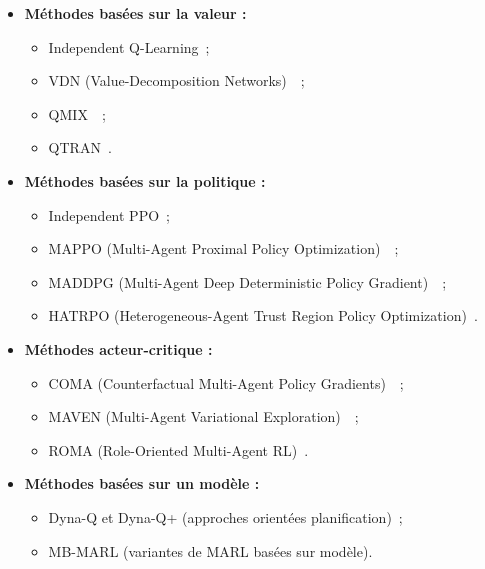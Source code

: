 \begin{itemize}
    \item \textbf{Méthodes basées sur la valeur :}
          \begin{itemize}
              \item Independent Q-Learning~;
              \item VDN (Value-Decomposition Networks)~\cite{sunehag2018vdn}~;
              \item QMIX~\cite{rashid2018qmix}~;
              \item QTRAN~\cite{son2019qtran}.
          \end{itemize}

    \item \textbf{Méthodes basées sur la politique :}
          \begin{itemize}
              \item Independent PPO~;
              \item MAPPO (Multi-Agent Proximal Policy Optimization)~\cite{yu2021mappo}~;
              \item MADDPG (Multi-Agent Deep Deterministic Policy Gradient)~\cite{lowe2017multi}~;
              \item HATRPO (Heterogeneous-Agent Trust Region Policy Optimization)~\cite{kuba2021trust}.
          \end{itemize}

    \item \textbf{Méthodes acteur-critique :}
          \begin{itemize}
              \item COMA (Counterfactual Multi-Agent Policy Gradients)~\cite{foerster2018counterfactual}~;
              \item MAVEN (Multi-Agent Variational Exploration)~\cite{mahajan2019maven}~;
              \item ROMA (Role-Oriented Multi-Agent RL)~\cite{wang2020roma}.
          \end{itemize}

    \item \textbf{Méthodes basées sur un modèle :}
          \begin{itemize}
              \item Dyna-Q et Dyna-Q+ (approches orientées planification)~;
              \item MB-MARL (variantes de MARL basées sur modèle).
          \end{itemize}
\end{itemize}

